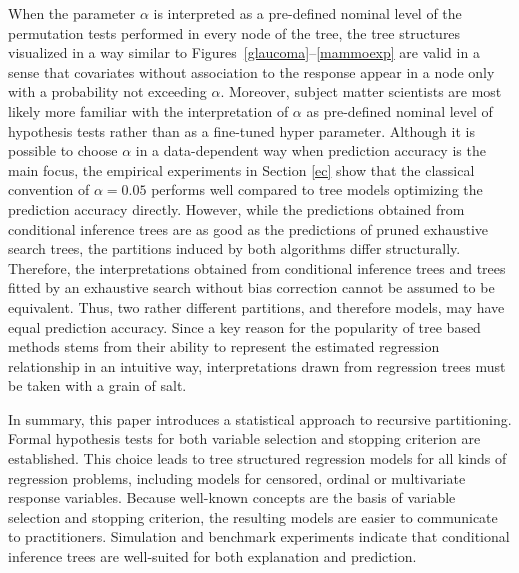 When the parameter $\alpha$ is interpreted as a pre-defined nominal level of
the permutation tests performed in every node of the tree, the tree
structures visualized in a way
similar to Figures~\ref{glaucoma}--\ref{mammoexp} are valid in a sense that
covariates without association to the response appear in a node only with a
probability not exceeding $\alpha$.  
Moreover, subject matter scientists are most likely more familiar with
the interpretation of $\alpha$ as pre-defined nominal level
of hypothesis tests rather than as a fine-tuned hyper parameter.
Although it is possible to choose
$\alpha$ in a data-dependent way when prediction accuracy is the main focus, 
the empirical experiments in Section
\ref{ec} show that the classical convention of $\alpha = 0.05$ performs
well compared to tree models optimizing the prediction accuracy directly. 
However, while the predictions obtained from
conditional inference trees are as good as the predictions of pruned
exhaustive search trees,
the partitions induced by both algorithms differ structurally. 
Therefore,
the interpretations obtained from conditional inference trees and trees
fitted by an exhaustive search without bias correction cannot be 
assumed to be equivalent. Thus, two rather different partitions, and
therefore models, may have equal prediction accuracy.
Since a key reason for the popularity of 
tree based methods
stems from their ability to represent the estimated regression relationship
in an intuitive way, interpretations drawn 
from regression trees must be taken with a grain of salt.

In summary, this paper introduces a statistical approach to recursive
partitioning. Formal hypothesis tests for both variable
selection and stopping criterion are established. This choice leads to 
tree structured regression models for all kinds of regression problems,
including models for censored, ordinal or multivariate response variables.
Because well-known concepts are the basis of variable selection and 
stopping criterion, the resulting models are easier to communicate to practitioners. 
Simulation and benchmark experiments indicate that conditional inference
trees are well-suited for both explanation and prediction.

